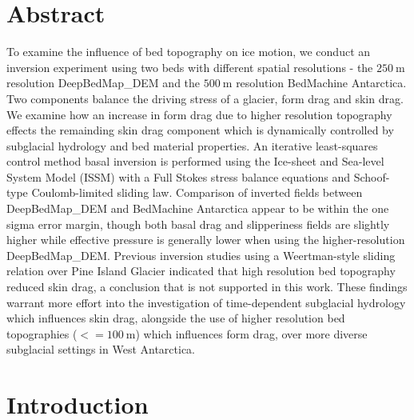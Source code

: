 
\section*{Abstract}

To examine the influence of bed topography on ice motion, we conduct an inversion experiment using two beds with different spatial resolutions - the $\SI{250}{\metre}$ resolution DeepBedMap\_DEM and the $\SI{500}{\metre}$ resolution BedMachine Antarctica.
Two components balance the driving stress of a glacier, form drag and skin drag.
We examine how an increase in form drag due to higher resolution topography effects the remainding skin drag component which is dynamically controlled by subglacial hydrology and bed material properties.
An iterative least-squares control method basal inversion is performed using the Ice-sheet and Sea-level System Model (ISSM) with a Full Stokes stress balance equations and Schoof-type Coulomb-limited sliding law.
Comparison of inverted fields between DeepBedMap\_DEM and BedMachine Antarctica appear to be within the one sigma error margin, though both basal drag and slipperiness fields are slightly higher while effective pressure is generally lower when using the higher-resolution DeepBedMap\_DEM.
Previous inversion studies using a Weertman-style sliding relation over Pine Island Glacier indicated that high resolution bed topography reduced skin drag, a conclusion that is not supported in this work.
These findings warrant more effort into the investigation of time-dependent subglacial hydrology which influences skin drag, alongside the use of higher resolution bed topographies ($<= \SI{100}{\metre}$) which influences form drag, over more diverse subglacial settings in West Antarctica.


\section{Introduction}

